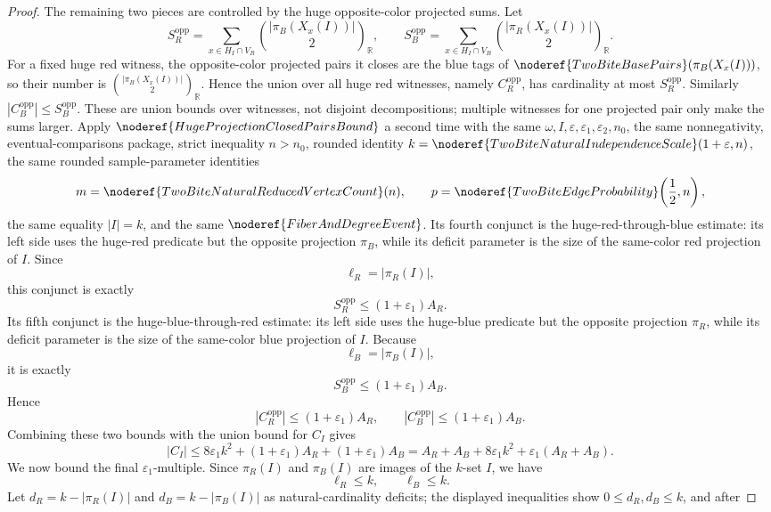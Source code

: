 \begin{proof}
The remaining two pieces are controlled by the huge opposite-color projected
sums.  Let
\[
S_R^{\mathrm{opp}}=
\sum_{x\in H_I\cap V_R}
  \binom{|\pi_B(X_x(I))|}{2}_{\mathbb R},
\qquad
S_B^{\mathrm{opp}}=
\sum_{x\in H_I\cap V_B}
  \binom{|\pi_R(X_x(I))|}{2}_{\mathbb R}.
\]
For a fixed huge red witness, the opposite-color projected pairs it closes are
the blue tags of
\(\noderef{TwoBiteBasePairs}(\pi_B(X_x(I)))\), so their number is
\(\binom{|\pi_B(X_x(I))|}{2}_{\mathbb R}\).  Hence the union over all huge red
witnesses, namely \(C_R^{\mathrm{opp}}\), has cardinality at most
\(S_R^{\mathrm{opp}}\).  Similarly
\(|C_B^{\mathrm{opp}}|\le S_B^{\mathrm{opp}}\).  These are union bounds over
witnesses, not disjoint decompositions; multiple witnesses for one projected
pair only make the sums larger.
Apply \(\noderef{HugeProjectionClosedPairsBound}\) a second time with the same
\(\omega,I,\varepsilon,\varepsilon_1,\varepsilon_2,n_0\), the same
nonnegativity, eventual-comparisons package, strict inequality \(n>n_0\),
rounded identity \(k=\noderef{TwoBiteNaturalIndependenceScale}(1+\varepsilon,n)\),
the same rounded sample-parameter identities
\[
m=\noderef{TwoBiteNaturalReducedVertexCount}(n),\qquad
p=\noderef{TwoBiteEdgeProbability}\!\left(\frac12,n\right),
\]
the same equality \(|I|=k\), and the same \(\noderef{FiberAndDegreeEvent}\).
Its fourth conjunct is the huge-red-through-blue estimate: its left side uses
the huge-red predicate but the opposite projection \(\pi_B\), while its
deficit parameter is the size of the same-color red projection of \(I\).  Since
\[
\ell_R=|\pi_R(I)|,
\]
this conjunct is exactly
\[
S_R^{\mathrm{opp}}\le(1+\varepsilon_1)A_R.
\]
Its fifth conjunct is the huge-blue-through-red estimate: its left side uses
the huge-blue predicate but the opposite projection \(\pi_R\), while its
deficit parameter is the size of the same-color blue projection of \(I\).
Because
\[
\ell_B=|\pi_B(I)|,
\]
it is exactly
\[
S_B^{\mathrm{opp}}\le(1+\varepsilon_1)A_B.
\]
Hence
\[
|C_R^{\mathrm{opp}}|\le (1+\varepsilon_1)A_R,
\qquad
|C_B^{\mathrm{opp}}|\le (1+\varepsilon_1)A_B.
\]
Combining these two bounds with the union bound for \(C_I\) gives
\[
|C_I|
\le
8\varepsilon_1k^2+(1+\varepsilon_1)A_R+(1+\varepsilon_1)A_B
=A_R+A_B+8\varepsilon_1k^2+\varepsilon_1(A_R+A_B).
\]
We now bound the final \(\varepsilon_1\)-multiple.  Since
\(\pi_R(I)\) and \(\pi_B(I)\) are images of the \(k\)-set \(I\), we have
\[
\ell_R\le k,\qquad \ell_B\le k.
\]
Let \(d_R=k-|\pi_R(I)|\) and \(d_B=k-|\pi_B(I)|\) as natural-cardinality
deficits; the displayed inequalities show \(0\le d_R,d_B\le k\), and after

\end{proof}
